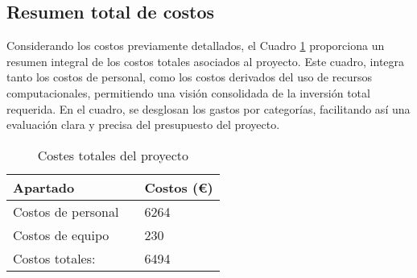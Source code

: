 \subsection{Resumen total de costos}

Considerando los costos previamente detallados, el Cuadro \ref{tabla_costes_total} proporciona un resumen integral de los costos totales asociados al proyecto. Este cuadro, integra tanto los costos de personal, como los costos derivados del uso de recursos computacionales, permitiendo una visión consolidada de la inversión total requerida. En el cuadro, se desglosan los gastos por categorías, facilitando así una evaluación clara y precisa del presupuesto del proyecto.

\begin{table}[H]
	\centering
	\begin{tabular}{|lll|}
		\hline
		Apartado 	 &\vline  & Costos (€) \\
		\hline
		
		Costos de personal    & \vline & 6264 \\			
		\hline
		Costos de equipo  	 & \vline & 230	\\

		\hline
		\hline
		Costos totales:				& \vline & 6494 \\
		\hline
	\end{tabular}
	\caption{Costes totales del proyecto}
	\label{tabla_costes_total}
\end{table}

